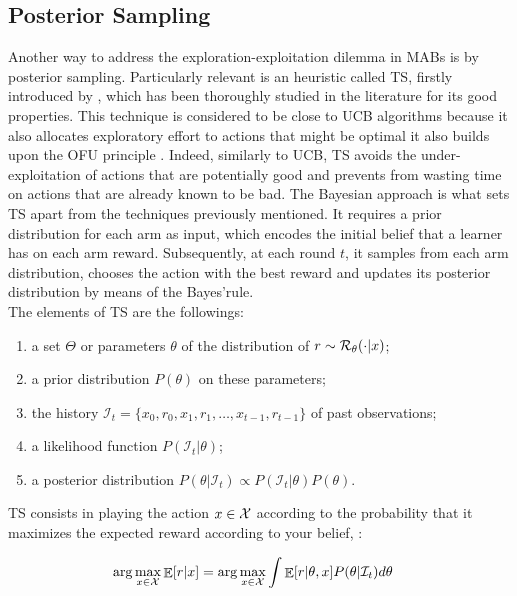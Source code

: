 \subsection{Posterior Sampling} \label{sub:posteriorMAB}
Another way to address the exploration-exploitation dilemma in \gls{MAB}s is by posterior sampling. Particularly relevant is an heuristic called \gls{TS}, firstly introduced by \cite{thompson1933likelihood}, which has been thoroughly studied in the literature for its good properties. This technique is considered to be close to \gls{UCB} algorithms because it also allocates exploratory effort to actions that might be optimal \ie it also builds upon the \gls{OFU} principle \cite{russo2013eluder}. Indeed, similarly to \gls{UCB}, \gls{TS} avoids the under-exploitation of actions that are potentially good and prevents from wasting time on actions that are already known to be bad. The Bayesian approach is what sets \gls{TS} apart from the techniques previously mentioned. It requires a prior distribution for each arm as input, which encodes the initial belief that a learner has on each arm reward. Subsequently, at each round $t$, it samples from each arm distribution, chooses the action with the best reward and updates its posterior distribution by means of the Bayes'rule.\\ The elements of \gls{TS} are the followings:

\begin{enumerate}
\item a set $\Theta$ or parameters $\theta$ of the distribution of $r\sim\mathcal{R}_{\theta}(\cdot|x)$;
\item a prior distribution $P(\theta)$ on these parameters;
\item the history $\mathcal{I}_t = \{x_0, r_0, x_1, r_1, \dots, x_{t-1}, r_{t-1}\}$ of past observations;
\item a likelihood function $P(\mathcal{I}_t|\theta)$;
\item a posterior distribution $P(\theta|\mathcal{I}_t)\propto P(\mathcal{I}_t|\theta)P(\theta)$.
\end{enumerate}

\gls{TS} consists in playing the action $x\in\mathcal{X}$ according to the probability that it maximizes the expected reward according to your belief, \ie:

\begin{align}
\arg\max_{x\in\mathcal{X}}\mathop{\mathbb{E}}[r|x] &= \arg\max_{x\in\mathcal{X}}\int\mathop{\mathbb{E}}[r|\theta,x]P(\theta|\mathcal{I}_t)d\theta
\end{align}

